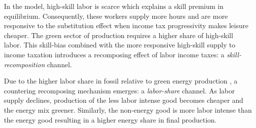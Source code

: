 
In the model, high-skill labor is scarce which explains a skill premium in equilibrium. Consequently, these workers supply more hours and are more responsive to the substitution effect when income tax progressivity makes leisure cheaper.
The green sector of production requires a higher share of high-skill labor. This skill-bias combined with the more responsive high-skill supply to income taxation introduces a recomposing effect of labor income taxes: a \textit{skill-recomposition} channel.

Due to the higher labor share in fossil relative to green energy production \citep{Fried2018ClimateAnalysis}, a countering recomposing mechanism emerges: a \textit{labor-share} channel. As labor supply declines, production of the less labor intense good becomes cheaper and the energy mix greener. Similarly, the non-energy good is more labor intense than the energy good resulting in a higher energy share in final production. 

	\begin{comment}
content...
Directed technical change amplifies or mitigates this recomposing effect of the income tax. The market size effect renders research in the sector with the larger input market more profitable, whereas the price effect increases demand for scientists in the sector with the relatively scarcer good. Since the two energy goods are substitutes, previous research suggests that the market effect dominates and research is directed towards the sector with the bigger input market, that is, the fossil sector. 
As regards final good production, energy and non-energy goods are complements so that the price effect is expected to dominate and the recomposition towards high-skill supply should boost research in energy goods relative to non-energy goods.\footnote{\ For a discussion of these two mechanisms compare \cite{Acemoglu2002DirectedChange, Loebbing2019NationalChange, Hemous2021DirectedEconomics}.

	\end{comment}


